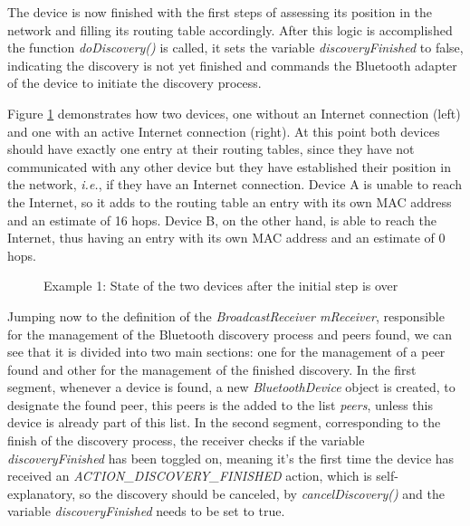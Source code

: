 The device is now finished with the first steps of assessing its position in the network and filling its routing table accordingly. After this logic is accomplished the function \textit{doDiscovery()} is called, it sets the variable \textit{discoveryFinished} to false, indicating the discovery is not yet finished and commands the Bluetooth adapter of the device to initiate the discovery process.

Figure \ref{fig:adveg1} demonstrates how two devices, one without an Internet connection (left) and one with an active Internet connection (right). At this point both devices should have exactly one entry at their routing tables, since they have not communicated with any other device but they have established their position in the network, \textit{i.e.}, if they have an Internet connection. Device A is unable to reach the Internet, so it adds to the routing table an entry with its own \gls{MAC} address and an estimate of 16 hops. Device B, on the other hand, is able to reach the Internet, thus having an entry with its own \gls{MAC} address and an estimate of 0 hops.

\begin{figure}[ht]
   \noindent{}
	\caption{\label{fig:adveg1} Example 1: State of the two devices after the initial step is over}
\end{figure}

Jumping now to the definition of the \textit{BroadcastReceiver mReceiver}, responsible for the management of the Bluetooth discovery process and peers found, we can see that it is divided into two main sections: one for the management of a peer found and other for the management of the finished discovery. In the first segment, whenever a device is found, a new \textit{BluetoothDevice} object is created, to designate the found peer, this peers is the added to the list \textit{peers}, unless this device is already part of this list. In the second segment, corresponding to the finish of the discovery process, the receiver checks if the variable \textit{discoveryFinished} has been toggled on, meaning it's the first time the device has received an \textit{ACTION\_DISCOVERY\_FINISHED} action, which is self-explanatory, so the discovery should be canceled, by \textit{cancelDiscovery()} and the variable \textit{discoveryFinished} needs to be set to true.

